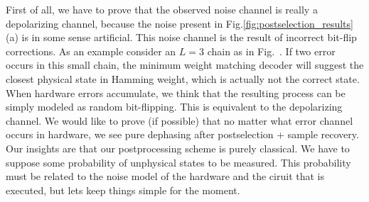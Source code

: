 \documentclass[a4paper]{article}
\begin{document}
First of all, we have to prove that the observed noise channel is really a depolarizing channel, because the noise present in Fig.\ref{fig:postselection_results}(a) is in some sense artificial. This noise channel is the result of incorrect bit-flip corrections. As an example consider an $L = 3$ chain as in Fig.~. If two error occurs in this small chain, the minimum weight matching decoder will suggest the closest physical state in Hamming weight, which is actually not the correct state. When hardware errors accumulate, we think that the resulting process can be simply modeled as random bit-flipping. This is equivalent to the depolarizing channel. We would like to prove (if possible) that no matter what error channel occurs in hardware, we see pure dephasing after postselection + sample recovery. Our insights are that our postprocessing scheme is purely classical. We have to suppose some probability of unphysical states to be measured. This probability must be related to the noise model of the hardware and the ciruit that is executed, but lets keep things simple for the moment.
\end{document}
